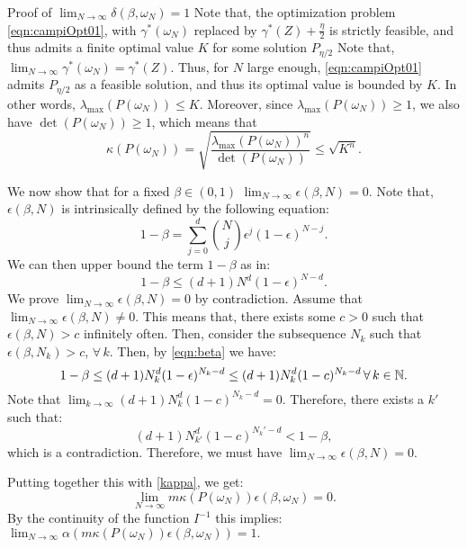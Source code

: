 \begin{subsection}{Proof of  $\lim_{N \to \infty}\delta(\beta, \omega_N) = 1$}
\label{app:bound}
Note that, the optimization problem \eqref{eqn:campiOpt01}, with $\gamma^*(\omega_N)$ replaced by $\gamma^*(Z)+\frac{\eta}{2}$ is strictly feasible, and thus admits a finite optimal value $K$ for some solution $P_{\eta/2}$ Note that, $\lim_{N \to \infty} \gamma^*(\omega_N)= \gamma^*(Z).$ Thus, for $N$ large enough, \eqref{eqn:campiOpt01} admits $P_{\eta/2}$ as a feasible solution, and thus its optimal value is bounded by $K.$ In other words, \mbox{$\lambda_{\max}(P({\omega_N})) \leq K$.} Moreover, since  
$\lambda_{\max}(P(\omega_N))\geq 1$, we also have \mbox{$\det(P(\omega_N)) \geq 1$,} which means that
\begin{equation}\label{kappa}\kappa(P(\omega_N)) = \sqrt{\frac{\lambda_{\max}(P(\omega_N))^n}{\det(P(\omega_N))}} \leq \sqrt{K^n}.\end{equation}

We now show that for a fixed $\beta \in (0,1)$ $\lim_{N \to \infty} \epsilon(\beta, N) = 0.$ Note that, $\epsilon(\beta, N)$ is intrinsically defined by the following equation:
$$1-\beta = \sum_{j=0}^d {{N}\choose{j}} \epsilon^j (1-\epsilon)^{N-j}.$$
We can then upper bound the term $1-\beta$ as in:
\begin{equation}\label{eqn:beta}1-\beta \leq  (d+1)N^d (1-\epsilon)^{N-d}.\end{equation}
We prove $\lim_{N \to \infty} \epsilon(\beta, N) = 0$ by contradiction. Assume that $\lim_{N \to \infty} \epsilon(\beta, N) \not= 0$. This means that, there exists some $c > 0$ such that $\epsilon(\beta, N) > c$ infinitely often. Then, consider the subsequence $N_k$ such that $\epsilon(\beta, N_k) > c$, $\forall\, k.$ Then, by \eqref{eqn:beta} we have:
\begin{equation*}1-\beta\leq  (d+1)N_k^d (1-\epsilon)^{N_k-d} \leq (d+1)N_k^d (1-c)^{N_k-d}\, \forall\,k \in \mathbb{N}. 
\end{equation*}
Note that $\lim_{k \to \infty}(d+1)N_k^d (1-c)^{N_k-d} = 0.$ Therefore, there exists a $k'$ such that:
$$(d+1)N_{k'}^d (1-c)^{N_k'-d} < 1 - \beta,$$ which is a contradiction. Therefore, we must have  $\lim_{N \to \infty} \epsilon (\beta, N) = 0$.

Putting together this with \eqref{kappa}, we get:
$$\lim_{N \to \infty} m \kappa(P(\omega_N))\epsilon(\beta, \omega_N) = 0.$$ By the continuity of the function $I^{-1}$ this implies: $\lim_{N \to \infty} \alpha(m \kappa(P(\omega_N))\epsilon(\beta, \omega_N)) = 1.$


\end{subsection}









